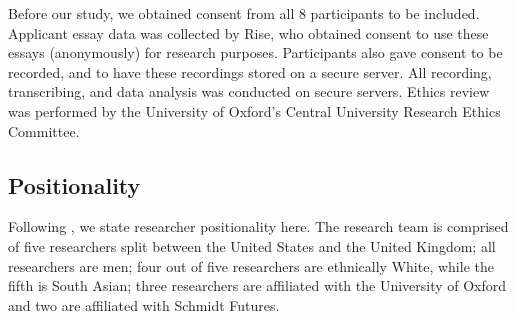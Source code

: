 Before our study, we obtained consent from all 8 participants to be included. Applicant essay data was collected by Rise, who obtained consent to use these essays (anonymously) for research purposes. Participants also gave consent to be recorded, and to have these recordings stored on a secure server. All recording, transcribing, and data analysis was conducted on secure servers. Ethics review was performed by the University of Oxford's Central University Research Ethics Committee.

\subsection{Positionality}
Following \textcite{venn-wycherley_realities_2024}, we state researcher positionality here. The research team is comprised of five researchers split between the United States and the United Kingdom; all researchers are men; four out of five researchers are ethnically White, while the fifth is South Asian; three researchers are affiliated with the University of Oxford and two are affiliated with Schmidt Futures.

